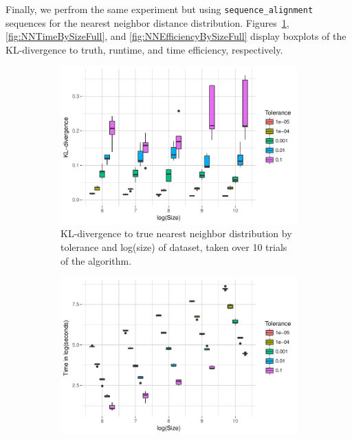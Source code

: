 \documentclass{article}
\begin{document}
Finally, we perfrom the same experiment but using \texttt{sequence\_alignment} sequences for the nearest neighbor distance distribution.
Figures~\ref{fig:NNDivBySizeFull}, \ref{fig:NNTimeBySizeFull}, and \ref{fig:NNEfficiencyBySizeFull} display boxplots of the KL-divergence to truth, runtime, and time efficiency, respectively.
\begin{figure}
	\begin{subfigure}{0.5\textwidth}
    	\includegraphics[width=\linewidth]{Figures/NearestNeighbor/Sequence/div_by_size_and_tol.pdf}
    	\caption{KL-divergence to true nearest neighbor distribution by tolerance and log(size) of dataset, taken over 10 trials of the algorithm.}
    	\label{fig:NNDivBySizeFull}
	\end{subfigure}
	\begin{subfigure}{0.5\textwidth}
    	\includegraphics[width=\linewidth]{Figures/NearestNeighbor/Sequence/time_by_size_and_tol.pdf}

\end{subfigure}
\end{figure}
\end{document}

